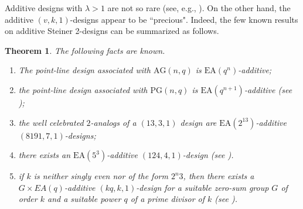 \documentclass[a4paper, 11pt]{article}
\newtheorem{theorem}{Theorem}[section]
\theoremstyle{definition}
\theoremstyle{definition}
\theoremstyle{definition}
\numberwithin{equation}{section}
\begin{document}
Additive designs with $\lambda>1$ are not so rare (see, e.g., \cite{BN0,BMN,CF,CFP2,N,P,T}).
On the other hand, the additive $(v,k,1)$-designs appear to be ``precious".
Indeed, the few known results on additive Steiner 2-designs can be summarized as follows.
\begin{theorem}\label{summary} The following facts are known.
\begin{enumerate}
\item[(i)] The point-line design associated with $\mathrm{AG}(n,q)$ is $\mathrm{EA}(q^n)$-additive;
\item[(ii)] the point-line design associated with $\mathrm{PG}(n,q)$ is $\mathrm{EA}(q^{n+1})$-additive (see \cite{CFP,BN2});
\item[(iii)] the well celebrated $2$-analogs of a $(13,3,1)$ design \cite{BEOVW} are
$\mathrm{EA}(2^{13})$-additive $(8191,7,1)$-designs;
\item[(iv)] there exists an $\mathrm{EA}(5^3)$-additive $(124,4,1)$-design (see \cite{BMN}).
\item[(v)] if $k$ is neither singly even nor of the form $2^n3$, then there exists a $G\times EA(q)$-additive $(kq,k,1)$-design 
for a suitable zero-sum group $G$ of order $k$ and a suitable power $q$ of a prime divisor of $k$  (see \cite{BN1}).
\end{enumerate}
\end{theorem}
\end{document}
